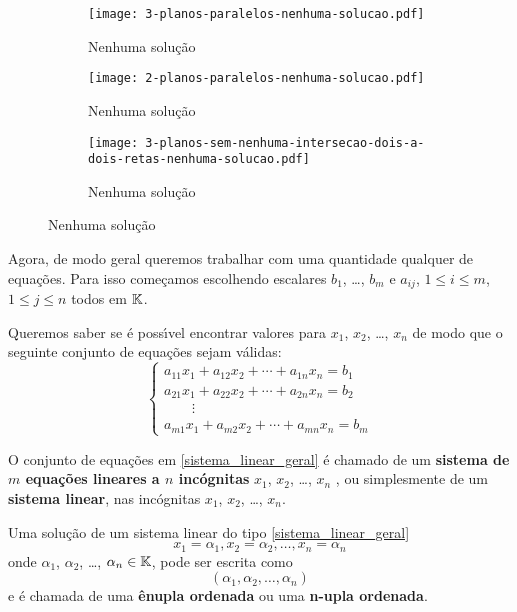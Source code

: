 \begin{enumerate}
\begin{figure}[h]
            \begin{subfigure}{.32\textwidth}
                \centering
                \texttt{[image: 3-planos-paralelos-nenhuma-solucao.pdf]}
                \caption{Nenhuma solu\c{c}\~ao}
            \end{subfigure}
            \begin{subfigure}{.32\textwidth}
                \centering
                \texttt{[image: 2-planos-paralelos-nenhuma-solucao.pdf]}
                 \caption{Nenhuma solu\c{c}\~ao}
              \end{subfigure}
            \begin{subfigure}{.32\textwidth}
                \centering  
           \texttt{[image: 3-planos-sem-nenhuma-intersecao-dois-a-dois-retas-nenhuma-solucao.pdf]}
            \caption{Nenhuma solu\c{c}\~ao}
           \end{subfigure}
        \end{figure}
\end{enumerate}

Agora, de modo geral queremos trabalhar com uma quantidade qualquer de equa\c{c}\~oes. Para isso come\c{c}amos escolhendo escalares $b_1$, \dots, $b_m$  e $a_{ij}$,  $1 \le i \le m$, $1 \le j \le n$ todos em $\mathbb{K}$.

Queremos saber se \'e poss{\'\i}vel encontrar valores para  $x_1$, $x_2$, \dots, $x_n$  de modo que o seguinte conjunto de equa\c{c}\~oes sejam v\'alidas: 
\begin{equation}\label{sistema_linear_geral}
\begin{cases}
        a_{11}x_1 + a_{12}x_2 + \cdots + a_{1n}x_n = b_1\\
        a_{21}x_1 + a_{22}x_2 + \cdots + a_{2n}x_n = b_2\\
        \qquad \vdots\\
        a_{m1}x_1 + a_{m2}x_2 + \cdots + a_{mn}x_n = b_m
    \end{cases}
\end{equation}

O conjunto de equa\c{c}\~oes em \eqref{sistema_linear_geral} \'e chamado de um  \textbf{sistema de $m$ equa\c{c}\~oes lineares  a $n$ inc\'ognitas} $x_1$, $x_2$, \dots, $x_n$ , ou simplesmente de um \textbf{sistema linear}, nas inc\'ognitas  $x_1$, $x_2$, \dots, $x_n$.

Uma solu\c{c}\~ao de um sistema linear do tipo \eqref{sistema_linear_geral}
\[
    x_1 = \alpha_1,  x_2 = \alpha_2,  \dots, x_n = \alpha_n
\]
onde $\alpha_1$, $\alpha_2$, \dots, $\alpha_n \in \mathbb{K}$,  pode ser escrita como
\[
    (\alpha_1, \alpha_2, \dots, \alpha_n)
\]
e \'e chamada de uma \textbf{\^enupla ordenada} ou uma \textbf{n-upla ordenada}.


